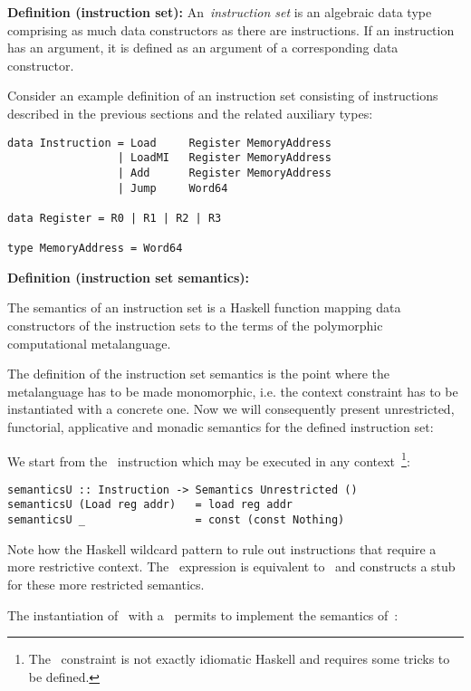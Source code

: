 \textbf{Definition (instruction set):} An~\emph{instruction set} is an algebraic data type
comprising as much data constructors as there are instructions.
If an instruction has an argument, it is defined as an argument of a corresponding data constructor.

Consider an example definition of an instruction set consisting
of instructions described in the previous sections and the related auxiliary types:

\begin{verbatim}
data Instruction = Load     Register MemoryAddress
                 | LoadMI   Register MemoryAddress
                 | Add      Register MemoryAddress
                 | Jump     Word64

data Register = R0 | R1 | R2 | R3

type MemoryAddress = Word64
\end{verbatim}

\textbf{Definition (instruction set semantics):}

The semantics of an instruction set is a Haskell function mapping
data constructors of the instruction sets to the terms of the polymorphic
computational metalanguage.

The definition of the instruction set semantics is the point where the metalanguage
has to be made monomorphic, i.e. the context constraint has to be instantiated with
a concrete one. Now we will consequently present unrestricted, functorial,
applicative and monadic semantics for the defined instruction set:

We start from the~ instruction which may be executed in any
context~\footnote{The~ constraint is not exactly idiomatic Haskell and
requires some tricks to be defined.}:

\begin{verbatim}
semanticsU :: Instruction -> Semantics Unrestricted ()
semanticsU (Load reg addr)   = load reg addr
semanticsU _                 = const (const Nothing)
\end{verbatim}

Note how the Haskell wildcard pattern to rule out instructions that require a more
restrictive context. The~ expression is equivalent
to~ and constructs a stub for these more restricted
semantics.

The instantiation of~ with a~ permits to implement the semantics
of~:

